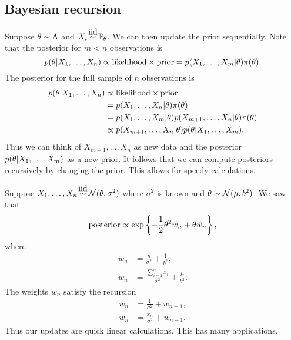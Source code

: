 \subsection{Bayesian recursion}
Suppose ${\theta} \sim \Lambda$ and $X_i \iid \Pa_\ta$. We can then update the prior sequentially. Note that the posterior for $m <n$ observations is
\[p({\theta}|X_1,\ldots,X_n) \propto \text{likelihood}\times\text{prior} = p(X_1,\ldots, X_m|{\theta})\pi({\theta}). \]
The posterior for the full sample of $n$ observations is
\begin{align*}
    p({\theta}|X_1,\ldots,X_n)&\propto \text{likelihood}\times \text{prior}\\
    &= p(X_1,\ldots,X_n | {\theta}) \pi({\theta})\\
    &= p(X_1,\ldots, X_{m}|{\theta}) p(X_{m+1},\ldots, X_n | {\theta}) \pi({\theta})\\
    &\propto p(X_{m+1},\ldots, X_n | {\theta})p({\theta}|X_1,\ldots, X_m).
\end{align*} 
Thus we can think of $X_{m+1},\ldots,X_n$ as new data and the posterior $p({\theta}|X_1,\ldots, X_m)$ as a new prior. It follows that we can compute posteriors recursively by changing the prior. This allows for speedy calculations.
\begin{ex}
    Suppose $X_1,\ldots,X_n\iid \Na(\ta,\sigma^2)$ where $\sigma^2$ is known and ${\theta} \sim {{\mathcal{N}}}(\mu,b^2)$. We saw that 
    \[\text{posterior} \propto \exp\left\{-\frac{1}{2}{\theta}^2 w_n+{\theta} \bar{w}_n\right\}, \]
    where
    \begin{align*}
        w_n &= \frac{n}{\sigma^2}+\frac{1}{b^2},\\
        \bar{w}_n &= \frac{\sum_{i=1}^n x_i}{\sigma^2}+\frac{\mu}{b^2}.
    \end{align*}
    The weights $w_n$ satisfy the recursion
    \begin{align*}
        w_n &= \frac{1}{\sigma^2}+w_{n-1},\\
        \bar{w}_n &= \frac{x_n}{\sigma^2}+\bar{w}_{n-1}.
    \end{align*}
    Thus our updates are quick linear calculations. This has many applications.
\end{ex}
